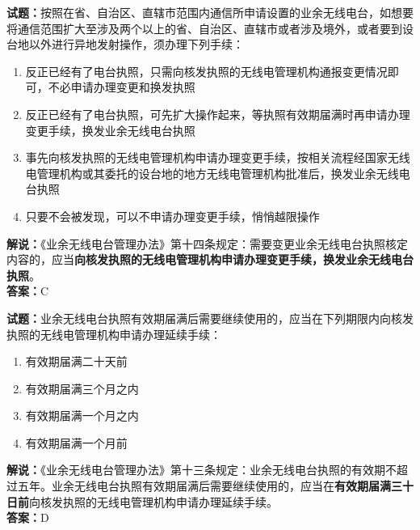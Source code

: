 \documentclass{ctexbook}
\begin{document}
\vspace{\baselineskip}

\noindent\textbf{试题：}按照在省、自治区、直辖市范围内通信所申请设置的业余无线电台，如想要将通信范围扩大至涉及两个以上的省、自治区、直辖市或者涉及境外，或者要到设台地以外进行异地发射操作，须办理下列手续：
\begin{enumerate}[leftmargin=3em]
  \item 反正已经有了电台执照，只需向核发执照的无线电管理机构通报变更情况即可，不必申请办理变更和换发执照
  \item 反正已经有了电台执照，可先扩大操作起来，等执照有效期届满时再申请办理变更手续，换发业余无线电台执照
  \item 事先向核发执照的无线电管理机构申请办理变更手续，按相关流程经国家无线电管理机构或其委托的设台地的地方无线电管理机构批准后，换发业余无线电台执照
  \item 只要不会被发现，可以不申请办理变更手续，悄悄越限操作
\end{enumerate}
\noindent\textbf{解说：}《业余无线电台管理办法》第十四条规定：需要变更业余无线电台执照核定内容的，应当\textbf{向核发执照的无线电管理机构申请办理变更手续，换发业余无线电台执照}。\\\noindent\textbf{答案：}C

\vspace{\baselineskip}

\noindent\textbf{试题：}业余无线电台执照有效期届满后需要继续使用的，应当在下列期限内向核发执照的无线电管理机构申请办理延续手续：
\begin{enumerate}[leftmargin=3em]
  \item 有效期届满二十天前
  \item 有效期届满三个月之内
  \item 有效期届满一个月之内
  \item 有效期届满一个月前
\end{enumerate}
\noindent\textbf{解说：}《业余无线电台管理办法》第十三条规定：业余无线电台执照的有效期不超过五年。业余无线电台执照有效期届满后需要继续使用的，应当在\textbf{有效期届满三十日前}向核发执照的无线电管理机构申请办理延续手续。\\\noindent\textbf{答案：}D

\vspace{\baselineskip}
\end{document}
